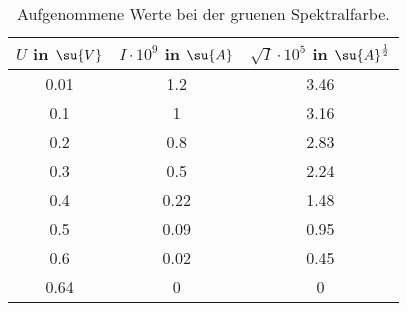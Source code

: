\begin{table}
  \centering
  \label{tab:Gelb_Komplett}
  \caption{Aufgenommene Werte bei der gruenen Spektralfarbe.}
  \begin{tabular}{c c c}
    \toprule
    $U$ in $\su{V}$ & $I\cdot 10^{9}$ in $\su{A}$ & $\sqrt{I}\cdot10^{5}$ in $\su{A}^{\frac{1}{2}}$ \\
    \midrule
    0.01 & 1.2  & 3.46 \\
    0.1  & 1    & 3.16 \\
    0.2  & 0.8  & 2.83 \\
    0.3  & 0.5  & 2.24 \\
    0.4  & 0.22 & 1.48 \\
    0.5  & 0.09 & 0.95 \\
    0.6  & 0.02 & 0.45 \\
    0.64 & 0    & 0    \\
    \bottomrule
  \end{tabular}
\end{table}
